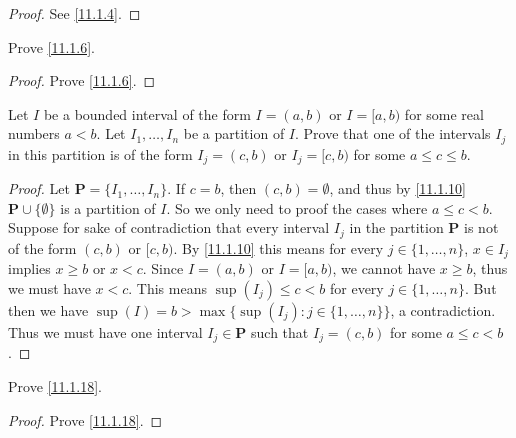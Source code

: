 \begin{proof}
  See \cref{11.1.4}.
\end{proof}

\begin{exercise}\label{ex 11.1.2}
  Prove \cref{11.1.6}.
\end{exercise}

\begin{proof}
  Prove \cref{11.1.6}.
\end{proof}

\begin{exercise}\label{ex 11.1.3}
  Let \(I\) be a bounded interval of the form \(I = (a, b)\) or \(I = [a, b)\) for some real numbers \(a < b\).
  Let \(I_1, \dots, I_n\) be a partition of \(I\).
  Prove that one of the intervals \(I_j\) in this partition is of the form \(I_j = (c, b)\) or \(I_j = [c, b)\) for some \(a \leq c \leq b\).
\end{exercise}

\begin{proof}
  Let \(\mathbf{P} = \{I_1, \dots, I_n\}\).
  If \(c = b\), then \((c, b) = \emptyset\), and thus by \cref{11.1.10} \(\mathbf{P} \cup \{\emptyset\}\) is a partition of \(I\).
  So we only need to proof the cases where \(a \leq c < b\).
  Suppose for sake of contradiction that every interval \(I_j\) in the partition \(\mathbf{P}\) is not of the form \((c, b)\) or \([c, b)\).
  By \cref{11.1.10} this means for every \(j \in \{1, \dots, n\}\), \(x \in I_j\) implies \(x \geq b\) or \(x < c\).
  Since \(I = (a, b)\) or \(I = [a, b)\), we cannot have \(x \geq b\), thus we must have \(x < c\).
  This means \(\sup(I_j) \leq c < b\) for every \(j \in \{1, \dots, n\}\).
  But then we have \(\sup(I) = b > \max\big\{\sup(I_j) : j \in \{1, \dots, n\}\big\}\), a contradiction.
  Thus we must have one interval \(I_j \in \mathbf{P}\) such that \(I_j = (c, b)\) for some \(a \leq c < b\).
\end{proof}

\begin{exercise}\label{ex 11.1.4}
  Prove \cref{11.1.18}.
\end{exercise}

\begin{proof}
  Prove \cref{11.1.18}.
\end{proof}